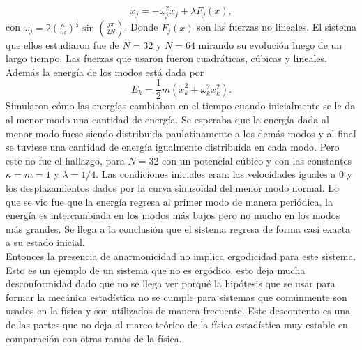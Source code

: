 \begin{equation}
\ddot{x}_{j}= - \omega_{j}^{2} x_{j} +\lambda F_{j}(x),
\end{equation}
con $\omega_{j} =2(\frac{\kappa }{m})^{\frac{1}{2}} \sin (\frac{j \pi}{2N})$. Donde $F_{j}(x)$ son las fuerzas no lineales. El sistema que ellos estudiaron fue de $N=32$  y $N=64$ mirando su evolución luego de un largo tiempo. Las fuerzas que usaron fueron cuadráticas, cúbicas y lineales. Además la energía de los modos está dada por 
\begin{equation}
E_{k} = \frac{1}{2} m(\dot{x}^{2}_{k}+ \omega_{k}^{2}x_{k}^{2}).
\end{equation}
Simularon cómo las energías cambiaban en el tiempo cuando inicialmente se le da al menor modo una cantidad de energía. Se esperaba que la energía dada al menor modo fuese siendo distribuida paulatinamente a los demás modos y al final se tuviese una cantidad de energía igualmente distribuida en cada modo. Pero este no fue el hallazgo, para $N=32$ con un potencial cúbico y con las constantes $\kappa=m=1$ y $\lambda=1/4$. Las condiciones iniciales eran: las velocidades iguales a 0 y los desplazamientos dados por la curva sinusoidal del menor modo normal. Lo que se vio fue que la energía regresa al primer modo de manera periódica, la energía es intercambiada en los modos más bajos pero no mucho en los modos más grandes. Se llega a la conclusión que el sistema regresa de forma casi exacta a su estado inicial. \\
Entonces la presencia de anarmonicidad no implica ergodicidad para este sistema. Esto es un ejemplo de un sistema que no es ergódico, esto deja mucha desconformidad dado que no se llega ver porqué la hipótesis que se usar para formar la mecánica estadística no se cumple para sistemas que comúnmente  son usados en la física y son utilizados de manera frecuente. Este descontento es una de las partes que no deja al marco teórico de la física estadística muy estable en comparación con otras ramas de la física.


